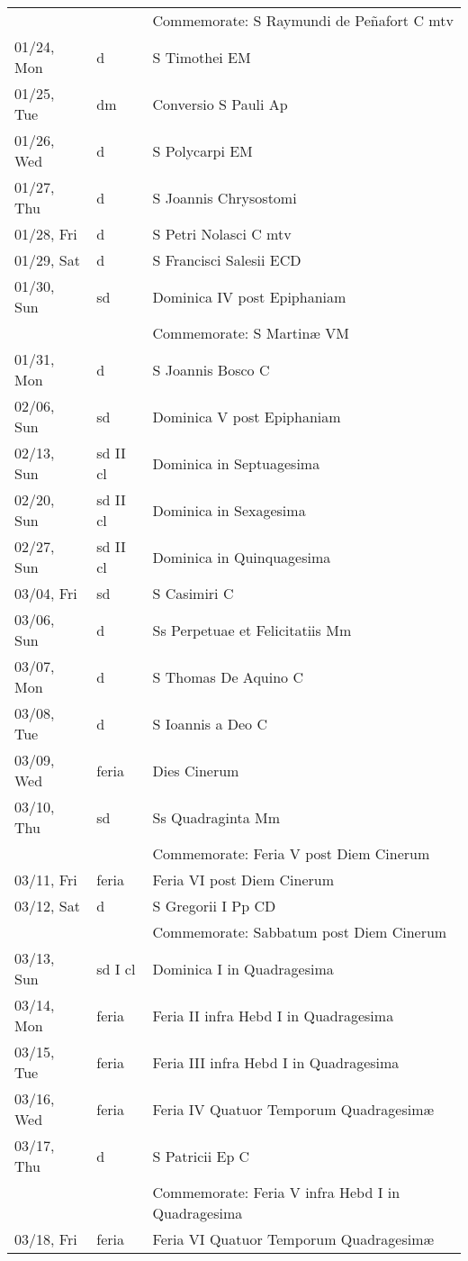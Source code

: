 \documentclass{article}
\begin{document}
\begin{longtable}{ l l l }
 & & Commemorate: S Raymundi de Peñafort C mtv\\
01/24, Mon & d & S Timothei EM\\
01/25, Tue & dm & Conversio S Pauli Ap\\
01/26, Wed & d & S Polycarpi EM\\
01/27, Thu & d & S Joannis Chrysostomi\\
01/28, Fri & d & S Petri Nolasci C mtv\\
01/29, Sat & d & S Francisci Salesii ECD\\
01/30, Sun & sd & Dominica IV post Epiphaniam\\
 & & Commemorate: S Martinæ VM\\
01/31, Mon & d & S Joannis Bosco C\\
02/06, Sun & sd & Dominica V post Epiphaniam\\
02/13, Sun & sd II cl & Dominica in Septuagesima\\
02/20, Sun & sd II cl & Dominica in Sexagesima\\
02/27, Sun & sd II cl & Dominica in Quinquagesima\\
03/04, Fri & sd & S Casimiri C\\
03/06, Sun & d & Ss Perpetuae et Felicitatiis Mm\\
03/07, Mon & d & S Thomas De Aquino C\\
03/08, Tue & d & S Ioannis a Deo C\\
03/09, Wed & feria & Dies Cinerum\\
03/10, Thu & sd & Ss Quadraginta Mm\\
 & & Commemorate: Feria V post Diem Cinerum\\
03/11, Fri & feria & Feria VI post Diem Cinerum\\
03/12, Sat & d & S Gregorii I Pp CD\\
 & & Commemorate: Sabbatum post Diem Cinerum\\
03/13, Sun & sd I cl & Dominica I in Quadragesima\\
03/14, Mon & feria & Feria II infra Hebd I in Quadragesima\\
03/15, Tue & feria & Feria III infra Hebd I in Quadragesima\\
03/16, Wed & feria & Feria IV Quatuor Temporum Quadragesimæ\\
03/17, Thu & d & S Patricii Ep C\\
 & & Commemorate: Feria V infra Hebd I in Quadragesima\\
03/18, Fri & feria & Feria VI Quatuor Temporum Quadragesimæ\\

\end{longtable}
\end{document}
